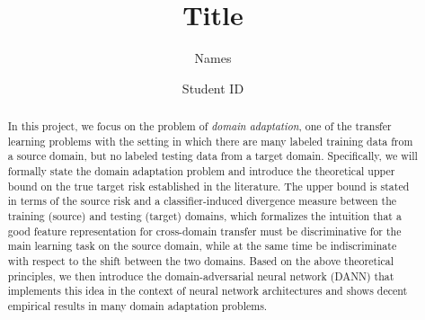 \documentclass[11pt]{article}
\title{Title}
\author{Names}
\date{Student ID}
\begin{document}
\maketitle

\thispagestyle{plain}

\begin{abstract}
In this project, we focus on the problem of \textit{domain adaptation}, one of the transfer learning problems with the setting in which there are many labeled training data from a source domain, but no labeled testing data from a target domain. Specifically, we will formally state the domain adaptation problem and introduce the theoretical upper bound on the true target risk established in the literature. The upper bound is stated in terms of the source risk and a classifier-induced divergence measure between the training (source) and testing (target) domains, which formalizes the intuition that a good feature representation for cross-domain transfer must be discriminative for the main learning task on the source domain, while at the same time be indiscriminate with respect to the shift between the two domains. Based on the above theoretical principles, we then introduce the domain-adversarial neural network (DANN) that implements this idea in the context of neural network architectures and shows decent empirical results in many domain adaptation problems.
\end{abstract}










\end{document}
